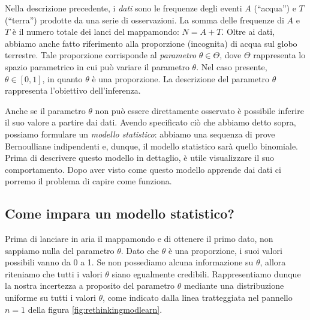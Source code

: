 \documentclass[
]{memoir}
\theoremstyle{definition}
\theoremstyle{definition}
\theoremstyle{definition}
\theoremstyle{definition}
\theoremstyle{remark}
\begin{document}
Nella descrizione precedente, i \emph{dati} sono le frequenze degli eventi \(A\) (``acqua'') e \(T\) (``terra'') prodotte da una serie di osservazioni. La somma delle frequenze di \(A\) e \(T\) è il numero totale dei lanci del mappamondo: \(N = A + T\). Oltre ai dati, abbiamo anche fatto riferimento alla proporzione (incognita) di acqua sul globo terrestre. Tale proporzione corrisponde al \emph{parametro} \(\theta \in \Theta\), dove \(\Theta\) rappresenta lo spazio parametrico in cui può variare il parametro \(\theta\). Nel caso presente, \(\theta \in [0, 1]\), in quanto \(\theta\) è una proporzione. La descrizione del parametro \(\theta\) rappresenta l'obiettivo dell'inferenza.

Anche se il parametro \(\theta\) non può essere direttamente osservato è possibile inferire il suo valore a partire dai dati. Avendo specificato ciò che abbiamo detto sopra, possiamo formulare un \emph{modello statistico}: abbiamo una sequenza di prove Bernoulliane indipendenti e, dunque, il modello statistico sarà quello binomiale. Prima di descrivere questo modello in dettaglio, è utile visualizzare il suo comportamento. Dopo aver visto come questo modello apprende dai dati ci porremo il problema di capire come funziona.

\hypertarget{come-impara-un-modello-statistico}{%
\subsection{Come impara un modello statistico?}\label{come-impara-un-modello-statistico}}

Prima di lanciare in aria il mappamondo e di ottenere il primo dato, non sappiamo nulla del parametro \(\theta\). Dato che \(\theta\) è una proporzione, i suoi valori possibili vanno da 0 a 1. Se non possediamo alcuna informazione su \(\theta\), allora riteniamo che tutti i valori \(\theta\) siano egualmente credibili. Rappresentiamo dunque la nostra incertezza a proposito del parametro \(\theta\) mediante una distribuzione uniforme su tutti i valori \(\theta\), come indicato dalla linea tratteggiata nel pannello \(n = 1\) della figura \ref{fig:rethinkingmodlearn}.
\end{document}

